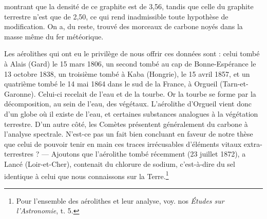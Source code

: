 \documentclass[a4paper, 11pt, oneside]{article}
\begin{document}
montrant que la densité de ce graphite est de 3,56, tandis que celle du graphite terrestre n'est que de 2,50, ce qui rend inadmissible toute hypothèse de modification. On a, du reste, trouvé des morceaux de carbone noyés dans la masse même du fer météorique.

Les aérolithes qui ont eu le privilège de nous offrir ces données sont : celui tombé à Alais (Gard) le 15 mars 1806, un second tombé au cap de Bonne-Espérance le 13 octobre 1838, un troisième tombé à Kaba (Hongrie), le 15 avril 1857, et un quatrième tombé le 14 mai 1864 dans le sud de la France, à Orgueil (Tarn-et-Garonne). Celui-ci recelait de l'eau et de la tourbe. Or la tourbe se forme par la décomposition, au sein de l'eau, des végétaux. L'aérolithe d'Orgueil vient donc d'un globe où il existe de l'eau, et certaines substances analogues à la végétation terrestre. D'un autre côté, les Comètes présentent généralement du carbone à l'analyse spectrale. N'est-ce pas un fait bien concluant en faveur de notre thèse que celui de pouvoir tenir en main ces traces irrécusables d'éléments vitaux extra-terrestres ? --- Ajoutons que l'aérolithe tombé récemment (23 juillet 1872), a Lancé (Loir-et-Cher), contenait du chlorure de sodium, c'est-à-dire du sel identique à celui que nous connaissons sur la Terre.\footnote{Pour l'ensemble des aérolithes et leur analyse, voy. nos \emph{Études sur l'Astronomie}, t. 5.}
\end{document}
